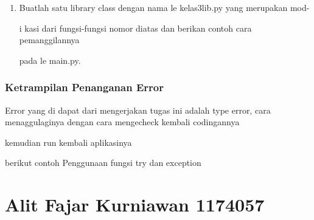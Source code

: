\begin{enumerate}
    



    \item Buatlah satu library class dengan nama 
le kelas3lib.py yang merupakan mod-

    i
kasi dari fungsi-fungsi nomor diatas dan berikan contoh cara pemanggilannya

    pada 
le main.py.

    

    

\end{enumerate}

\subsubsection{Ketrampilan Penanganan Error}

Error yang di dapat dari mengerjakan tugas ini adalah type error, cara menaggulaginya dengan cara mengecheck kembali codingannya

kemudian run kembali aplikasinya

berikut contoh Penggunaan fungsi try dan exception



\section{Alit Fajar Kurniawan 1174057}
